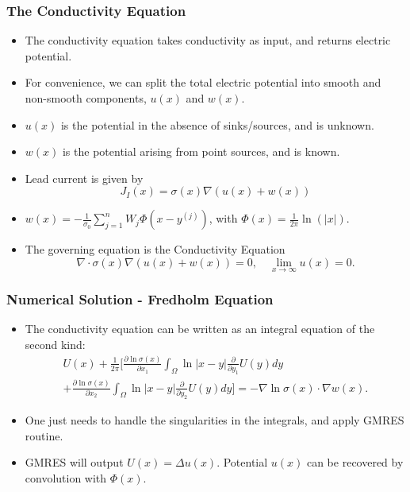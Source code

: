 \documentclass[]{beamer}
\begin{document}
\begin{frame}
    \frametitle{The Conductivity Equation}
  \begin{itemize}
    \item The conductivity equation takes conductivity as input, and returns electric potential.
    \item For convenience, we can split the total electric potential into smooth and non-smooth components, $u(x)$ and $w(x)$.
    \item $u(x)$ is the potential in the absence of sinks/sources, and is unknown.
    \item $w(x)$ is the potential arising from point sources, and is known.
  \item Lead current is given by
      \[
          J_I(x) = \sigma(x)\nabla(u(x)+w(x))
      \]
  \item $w(x) = -\frac{1}{\sigma_0}\sum_{j=1}^{n}W_j\Phi(x-y^{(j)})$, with $\Phi(x) = \frac{1}{2\pi}\ln(|x|)$.
\item The governing equation is the Conductivity Equation
    \[
        \nabla \cdot \sigma(x)\nabla(u(x)+w(x))=0, \quad \lim_{x \rightarrow \infty}u(x) = 0.
    \]
\end{itemize}
\end{frame}


\begin{frame}
    \frametitle{Numerical Solution - Fredholm Equation}
  \begin{itemize}
      \item The conductivity equation can be written as an integral equation of the second kind:
          \begin{multline*}
              U(x)+\frac{1}{2\pi} \Big[\frac{\partial \ln\sigma(x)}{\partial x_1}\int_{\Omega}\ln|x-y|\frac{\partial}{\partial y_1}U(y)dy\\+ \frac{\partial \ln\sigma(x)}{\partial x_2}\int_{\Omega}\ln|x-y|\frac{\partial}{\partial y_2}U(y)dy\Big]=-\nabla \ln\sigma(x)\cdot\nabla w(x).
          \end{multline*}
    \item One just needs to handle the singularities in the integrals, and apply GMRES routine.
    \item GMRES will output $U(x)=\Delta u(x)$. Potential $u(x)$ can be recovered by convolution with $\Phi(x)$.
  \end{itemize}
\end{frame}
\end{document}
